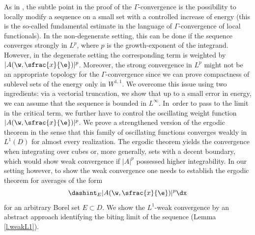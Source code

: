 As in \cite{NSS}, the subtle point in the proof of the $\Gamma$-convergence is the possibility to locally modify a sequence on a small set with a controlled increase of energy (this is the so-called fundamental estimate in the language of $\Gamma$-convergence of local functionals). In the non-degenerate setting, this can be done if the sequence converges strongly in $L^p$, where $p$ is the growth-exponent of the integrand. However, in the degenerate setting the corresponding term is weighted by $|A(\w,\sfrac{x}{\e})|^p$. Moreover, the strong convergence in $L^p$ might not be an appropriate topology for the $\Gamma$-convergence since we can prove compactness of sublevel sets of the energy only in $W^{1,1}$. We overcome this issue using two ingredients: via a vectorial truncation, we show that up to a small error in energy, we can assume that the sequence is bounded in $L^{\infty}$. In~order to pass to the limit in the critical term, we further have to control the oscillating weight function $|A(\w,\sfrac{x}{\e})|^p$. We prove a strengthened version of the ergodic theorem in the sense that this family of oscillating functions converges weakly in $L^1(D)$ for almost every realization. The ergodic theorem yields the convergence when integrating over cubes or, more generally, sets with a decent boundary, which would show weak convergence if $|A|^p$ possessed higher integrability. In our setting however, to show the weak convergence one needs to establish the ergodic theorem for averages of the form
\begin{equation*}
\dashint_E |A(\w,\sfrac{x}{\e})|^p\dx
\end{equation*}
for an arbitrary Borel set $E\subset D$. We show the $L^1$-weak convergence by an abstract approach identifying the biting limit of the sequence (\cf Lemma \ref{l.weakL1}).

